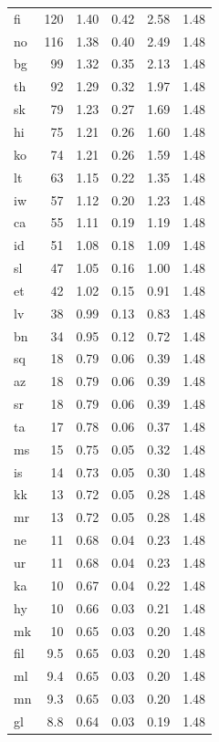 \documentclass{article} %
\begin{document}
\begin{table}[t]
\begin{center}
{\begin{tabular}{lrrrrr}
fi  & 120    & 1.40 & 0.42  & 2.58 & 1.48 \\
no  & 116    & 1.38 & 0.40  & 2.49 & 1.48 \\
bg  & 99     & 1.32 & 0.35  & 2.13 & 1.48 \\
th  & 92     & 1.29 & 0.32  & 1.97 & 1.48 \\
sk  & 79     & 1.23 & 0.27  & 1.69 & 1.48 \\
hi  & 75     & 1.21 & 0.26  & 1.60 & 1.48 \\
ko  & 74     & 1.21 & 0.26  & 1.59 & 1.48 \\
lt  & 63     & 1.15 & 0.22  & 1.35 & 1.48 \\
iw  & 57     & 1.12 & 0.20  & 1.23 & 1.48 \\
ca  & 55     & 1.11 & 0.19  & 1.19 & 1.48 \\
id  & 51     & 1.08 & 0.18  & 1.09 & 1.48 \\
sl  & 47     & 1.05 & 0.16  & 1.00 & 1.48 \\
et  & 42     & 1.02 & 0.15  & 0.91 & 1.48 \\
lv  & 38     & 0.99 & 0.13  & 0.83 & 1.48 \\
bn  & 34     & 0.95 & 0.12  & 0.72 & 1.48 \\
sq  & 18     & 0.79 & 0.06  & 0.39 & 1.48 \\
az  & 18     & 0.79 & 0.06  & 0.39 & 1.48 \\
sr  & 18     & 0.79 & 0.06  & 0.39 & 1.48 \\
ta  & 17     & 0.78 & 0.06  & 0.37 & 1.48 \\
ms  & 15     & 0.75 & 0.05  & 0.32 & 1.48 \\
is  & 14     & 0.73 & 0.05  & 0.30 & 1.48 \\
kk  & 13     & 0.72 & 0.05  & 0.28 & 1.48 \\
mr  & 13     & 0.72 & 0.05  & 0.28 & 1.48 \\
ne  & 11     & 0.68 & 0.04  & 0.23 & 1.48 \\
ur  & 11     & 0.68 & 0.04  & 0.23 & 1.48 \\
ka  & 10     & 0.67 & 0.04  & 0.22 & 1.48 \\
hy  & 10     & 0.66 & 0.03  & 0.21 & 1.48 \\
mk  & 10     & 0.65 & 0.03  & 0.20 & 1.48 \\
fil & 9.5    & 0.65 & 0.03  & 0.20 & 1.48 \\
ml  & 9.4    & 0.65 & 0.03  & 0.20 & 1.48 \\
mn  & 9.3    & 0.65 & 0.03  & 0.20 & 1.48 \\
gl  & 8.8    & 0.64 & 0.03  & 0.19 & 1.48 \\
\bottomrule
\end{tabular}

}
\end{center}
\end{table}
\end{document}
